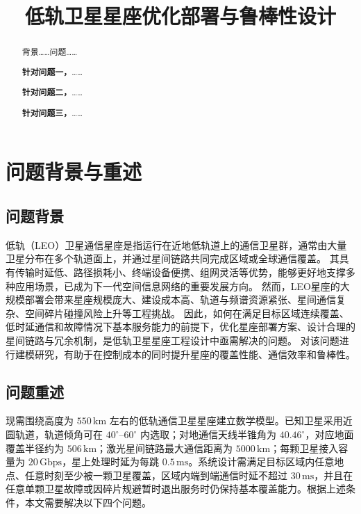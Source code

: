 \documentclass[withoutpreface,bwprint]{cumcmthesis} %
\title{低轨卫星星座优化部署与鲁棒性设计}
\begin{document}
\maketitle

\begin{abstract}
背景……问题……\par
\textbf{针对问题一，}……

\textbf{针对问题二，}……

\textbf{针对问题三，}……

\end{abstract}



\section{问题背景与重述}
\subsection{问题背景}
低轨（LEO）卫星通信星座是指运行在近地低轨道上的通信卫星群，通常由大量卫星分布在多个轨道面上，并通过星间链路共同完成区域或全球通信覆盖。
其具有传输时延低、路径损耗小、终端设备便携、组网灵活等优势，能够更好地支撑多种应用场景，已成为下一代空间信息网络的重要发展方向。
然而，LEO星座的大规模部署会带来星座规模庞大、建设成本高、轨道与频谱资源紧张、星间通信复杂、空间碎片碰撞风险上升等工程挑战。
因此，如何在满足目标区域连续覆盖、低时延通信和故障情况下基本服务能力的前提下，优化星座部署方案、设计合理的星间链路与冗余机制，是低轨卫星星座工程设计中亟需解决的问题。
对该问题进行建模研究，有助于在控制成本的同时提升星座的覆盖性能、通信效率和鲁棒性。
\subsection{问题重述}
现需围绕高度为 $550\,\mathrm{km}$ 左右的低轨通信卫星星座建立数学模型。已知卫星采用近圆轨道，轨道倾角可在 $40^\circ$--$60^\circ$ 内选取；对地通信天线半锥角为 $40.46^\circ$，对应地面覆盖半径约为 $506\,\mathrm{km}$；激光星间链路最大通信距离为 $5000\,\mathrm{km}$；每颗卫星接入容量为 $20\,\mathrm{Gbps}$，星上处理时延为每跳 $0.5\,\mathrm{ms}$。系统设计需满足目标区域内任意地点、任意时刻至少被一颗卫星覆盖，区域内端到端通信时延不超过 $30\,\mathrm{ms}$，并且在任意单颗卫星故障或因碎片规避暂时退出服务时仍保持基本覆盖能力。根据上述条件，本文需要解决以下四个问题。\par
\end{document}
